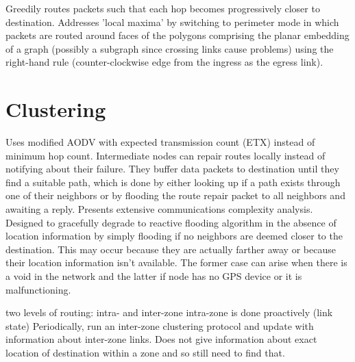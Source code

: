 \documentclass[conference]{IEEEtran}
\begin{document}
\cite{Karp2000} Greedily routes packets such that each hop becomes progressively closer to destination.  Addresses 'local maxima' by switching to perimeter mode in which packets are routed around faces of the polygons comprising the planar embedding of a graph (possibly a subgraph since crossing links cause problems) using the right-hand rule (counter-clockwise edge from the ingress as the egress link).


\section{Clustering}

\cite{Al-Rabayah2010} Uses modified AODV with expected transmission count (ETX) instead of minimum hop count.
Intermediate nodes can repair routes locally instead of notifying about their failure.
They buffer data packets to destination until they find a suitable path, which is done by either looking up if a path exists through one of their neighbors or by flooding the route repair packet to all neighbors and awaiting a reply.
Presents extensive communications complexity analysis.
Designed to gracefully degrade to reactive flooding algorithm in the absence of location information by simply flooding if no neighbors are deemed closer to the destination.
This may occur because they are actually farther away or because their location information isn't available.
The former case can arise when there is a void in the network and the latter if node has no GPS device or it is malfunctioning.

\cite{779923} two levels of routing: intra- and inter-zone
intra-zone is done proactively (link state)
Periodically, run an inter-zone clustering protocol and update with information about inter-zone links.
Does not give information about exact location of destination within a zone and so still need to find that.
\end{document}

